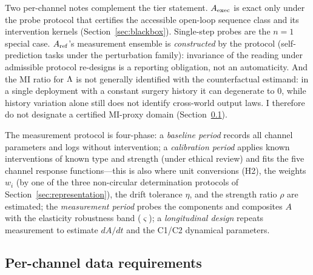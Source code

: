 Two per-channel notes complement the tier statement.
$A_{\mathrm{exec}}$ is exact only under the probe protocol that certifies the accessible
open-loop sequence class and its intervention kernels
(Section~\ref{sec:blackbox}). Single-step probes are the $n=1$ special case.
$A_{\mathrm{ref}}$'s measurement ensemble is \emph{constructed} by the protocol
(self-prediction tasks under the perturbation family): invariance of the
reading under admissible protocol re-designs is a reporting obligation, not
an automaticity. And the MI ratio for $\Lambda$ is not generally identified with the
counterfactual estimand: in a single deployment with a constant surgery
history it can degenerate to $0$, while history variation alone still does
not identify cross-world output laws. I therefore do not designate a certified
MI-proxy domain (Section~\ref{sec:datareq}).

The measurement protocol is four-phase: a \emph{baseline period} records all
channel parameters and logs without intervention; a \emph{calibration period}
applies known interventions of known type and strength (under ethical review)
and fits the five channel response functions---this is also where unit
conversions (H2), the weights $w_i$ (by one of the three non-circular
determination protocols of Section~\ref{sec:representation}), the drift
tolerance $\eta$, and the strength ratio $\rho$ are estimated; the \emph{measurement
period} probes the components and composites $A$ with the elasticity
robustness band ($\varsigma$); a \emph{longitudinal design} repeats measurement to estimate
$dA/dt$ and the C1/C2 dynamical parameters.

\subsection{Per-channel data requirements}\label{sec:datareq}


